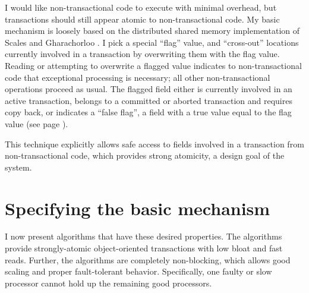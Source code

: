 I would like non-transactional code to execute with minimal overhead,
but transactions should still appear atomic to non-transactional
code.  My basic mechanism is loosely based on the
distributed shared memory implementation of Scales and Gharachorloo
\cite{ScalesGh97}.  I pick a special ``flag'' value, and
``cross-out'' locations currently involved in a transaction by
overwriting them with the flag value.  Reading or attempting to
overwrite a flagged value indicates to non-transactional code
that exceptional processing is necessary; all other non-transactional
operations proceed as usual.  The flagged field either is currently
involved in an active transaction, belongs to a committed or aborted
transaction and requires copy back, or indicates a ``false flag'', a
field with a true value equal to the flag value (see
page \pageref{pg:falseflag}).

This technique explicitly allows safe access to fields
involved in a transaction from non-transactional code, which provides
strong atomicity, a
design goal of the system.

\section{Specifying the basic mechanism}
I now present algorithms that have these desired properties.
The \apex algorithms provide strongly-atomic object-oriented
transactions with low bloat and fast reads.  Further, the \apex
algorithms are completely non-blocking, which allows good
scaling and proper fault-tolerant behavior.  Specifically, one faulty or slow
processor cannot hold up the remaining good processors.

